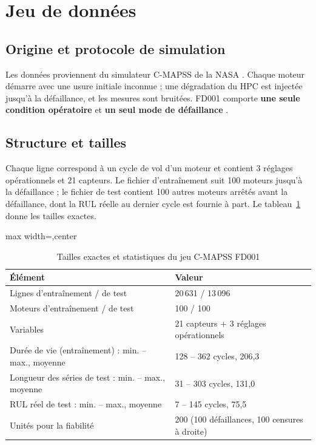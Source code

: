 \section{Jeu de données}\label{sec:donnees}

\subsection{Origine et protocole de simulation}\label{sec:donnees-origine}

Les données proviennent du simulateur C-MAPSS de la NASA \cite{saxena2008damage}. Chaque moteur démarre avec une usure initiale inconnue ; une dégradation du HPC est injectée jusqu'à la défaillance, et les mesures sont bruitées. FD001 comporte \textbf{une seule condition opératoire} et \textbf{un seul mode de défaillance} \cite{saxena2008data}.

\subsection{Structure et tailles}\label{sec:donnees-structure}

Chaque ligne correspond à un cycle de vol d'un moteur et contient 3 réglages opérationnels et 21 capteurs. Le fichier d'entraînement suit 100 moteurs jusqu'à la défaillance ; le fichier de test contient 100 autres moteurs arrêtés avant la défaillance, dont la RUL réelle au dernier cycle est fournie à part. Le tableau~\ref{tab:donnees_tailles} donne les tailles exactes.

\begin{table}[htbp]
\centering\small
\begin{adjustbox}{max width=\linewidth,center}
\begin{tabular}{ll}
\toprule
Élément & Valeur \\
\midrule
Lignes d'entraînement / de test & 20\,631 / 13\,096 \\
Moteurs d'entraînement / de test & 100 / 100 \\
Variables & 21 capteurs + 3 réglages opérationnels \\
Durée de vie (entraînement) : min. – max., moyenne & 128 – 362 cycles, 206,3 \\
Longueur des séries de test : min. – max., moyenne & 31 – 303 cycles, 131,0 \\
RUL réel de test : min. – max., moyenne & 7 – 145 cycles, 75,5 \\
Unités pour la fiabilité & 200 (100 défaillances, 100 censures à droite) \\
\bottomrule
\end{tabular}
\end{adjustbox}
\caption{Tailles exactes et statistiques du jeu C-MAPSS FD001}\label{tab:donnees_tailles}
\end{table}

